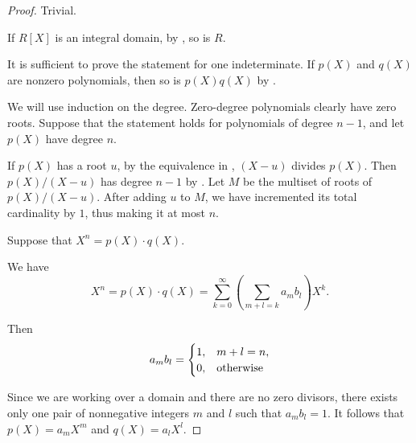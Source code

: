 \begin{proof}
   Trivial.


  \NecessitySubProof* If \( R[X] \) is an integral domain, by , so is \( R \).

  \SufficiencySubProof* It is sufficient to prove the statement for one indeterminate. If \( p(X) \) and \( q(X) \) are nonzero polynomials, then so is \( p(X) q(X) \) by .

   We will use induction on the degree. Zero-degree polynomials clearly have zero roots. Suppose that the statement holds for polynomials of degree \( n - 1 \), and let \( p(X) \) have degree \( n \).

  If \( p(X) \) has a root \( u \), by the equivalence in , \( (X - u) \) divides \( p(X) \). Then \( p(X) / (X - u) \) has degree \( n - 1 \) by . Let \( M \) be the multiset of roots of \( p(X) / (X - u) \). After adding \( u \) to \( M \), we have incremented its total cardinality by \( 1 \), thus making it at most \( n \).

   Suppose that \( X^n = p(X) \cdot q(X) \).

  We have
  \begin{equation*}
    X^n
    =
    p(X) \cdot q(X)
    =
    \sum_{k=0}^\infty (\sum_{m+l=k} a_m b_l) X^k.
  \end{equation*}

  Then
  \begin{equation*}
    a_m b_l = \begin{cases}
      1, &m + l = n, \\
      0, &\T{otherwise}
    \end{cases}
  \end{equation*}

  Since we are working over a domain and there are no zero divisors, there exists only one pair of nonnegative integers \( m \) and \( l \) such that \( a_m b_l = 1 \). It follows that \( p(X) = a_m X^m \) and \( q(X) = a_l X^l \).
\end{proof}


